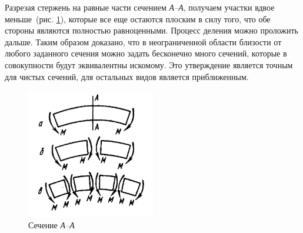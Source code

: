 \documentclass[12pt, a4paper]{article}
\begin{document}
Разрезая стержень на равные части сечением \emph{А--А}, получаем участки вдвое меньше~(рис. \ref{pic2}), которые все еще остаются плоским в силу того, что обе стороны являются полностью равноценными. Процесс деления можно проложить дальше. Таким образом доказано, что в неограниченной области близости от любого заданного сечения можно задать бесконечно много сечений, которые в совокупности будут эквивалентны искомому. Это утверждение является точным для чистых сечений, для остальных видов является приближенным.
\begin{figure}[!h]
	\centering
	\includegraphics[width=0.5\textwidth]{pic.2}%
	\caption{Сечение \emph{А--А}}
	\vspace*{-2mm}
	\label{pic2}
\end{figure}
\end{document}
